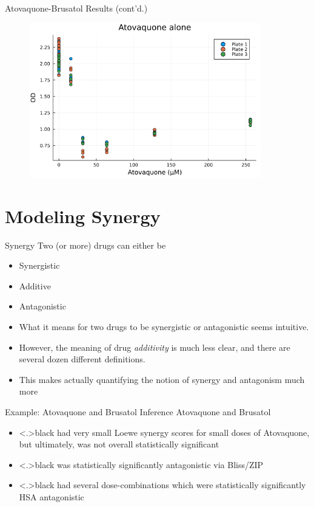 \documentclass{beamer}
\begin{document}
\begin{frame}{Atovaquone-Brusatol Results (cont'd.)}
    \begin{figure}[b]
        \includegraphics[width=0.9\textwidth]{figs/constant_rate_xto0.0.png}
    \end{figure}
\end{frame}


\section{Modeling Synergy}

\begin{frame}{Synergy}
    Two (or more) drugs can either be \begin{itemize}
        \item Synergistic 
        \item Additive
        \item Antagonistic
    \end{itemize}
   
    \vfill 
    \begin{itemize}
      \item What it means for two drugs to be synergistic or antagonistic seems intuitive.
      \item However, the meaning of drug \textit{additivity} is much less clear, and there are several dozen different definitions.
      \item This makes actually quantifying the notion of synergy and antagonism much more
    \end{itemize}

\end{frame}
\begin{frame}{Example: Atovaquone and Brusatol Inference}
    Atovaquone and Brusatol \begin{itemize}[<+->]\color{gray}
      \item \color<.>{black} had very small \alert{Loewe} synergy scores for small doses of Atovaquone, but ultimately, was not overall statistically significant
      \item \color<.>{black} was statistically significantly antagonistic via \alert{Bliss}/\alert{ZIP} 
      \item \color<.>{black} had several dose-combinations which were statistically significantly \alert{HSA} antagonistic
    \end{itemize}
\end{frame}
\end{document}
